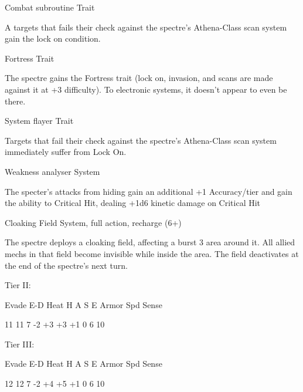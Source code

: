 Combat subroutine  
Trait
 
A targets that fails their check against the spectre’s Athena-Class scan system gain the lock on  
condition.
 

Fortress  
Trait
 
The spectre gains the Fortress trait (lock on, invasion, and scans are made against it at +3  
difficulty). To electronic systems, it doesn’t appear to even be there.
 

System flayer  
Trait
 
Targets that fail their check against the spectre’s Athena-Class scan system immediately suffer  
from Lock On.
 

Weakness analyser  
System
 
The specter’s attacks from hiding gain an additional +1 Accuracy/tier and gain the ability to  
Critical Hit, dealing +1d6 kinetic damage on Critical Hit
 

Cloaking Field  
System, full action, recharge (6+)
 
The spectre deploys a cloaking field, affecting a burst 3 area around it. All allied mechs in that  
field become invisible while inside the area. The field deactivates at the end of the spectre’s next  
turn.
 

Tier II:
 

          Evade     E-D     Heat    H     A     S     E        Armor        Spd       Sense 

          11        11      7       -2    +3    +3    +1       0            6         10 

Tier III:
 

          Evade     E-D     Heat    H     A     S     E        Armor        Spd       Sense 

          12        12      7       -2    +4    +5    +1       0            6         10 
